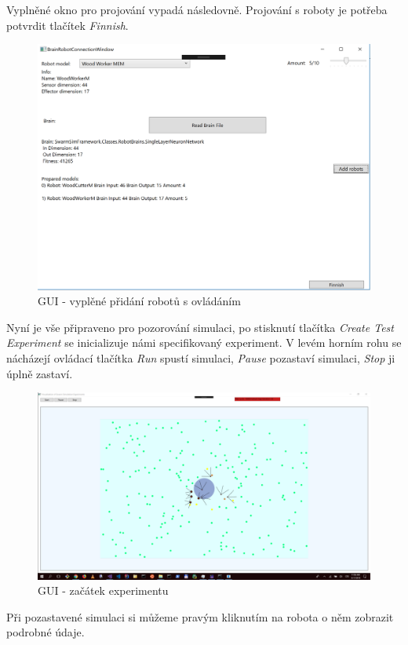 \documentclass[12pt, oneside]{article}
\begin{document}
\clearpage
Vyplněné okno pro projování vypadá následovně. Projování s roboty je potřeba potvrdit tlačítek \textit{Finnish}.
\begin{figure}[h]\centering
	\includegraphics[width=\columnwidth]{img/brain_con_full.png}
	\caption{GUI - vyplěné přidání robotů s ovládáním } 
\end{figure}
\clearpage
Nyní je vše připraveno pro pozorování simulaci, po stisknutí tlačítka \textit{Create Test Experiment} se inicializuje námi specifikovaný experiment. V levém horním rohu se nácházejí ovládací tlačítka \textit{Run} spustí simulaci, \textit{Pause} pozastaví simulaci, \textit{Stop} ji úplně zastaví. 
\begin{figure}[h]\centering
	\includegraphics[width=\columnwidth]{img/experiment_run.png}
	\caption{GUI - začátek experimentu } 
\end{figure}
\clearpage 
Při pozastavené simulaci si můžeme pravým kliknutím na robota o něm zobrazit podrobné údaje.
\end{document}
